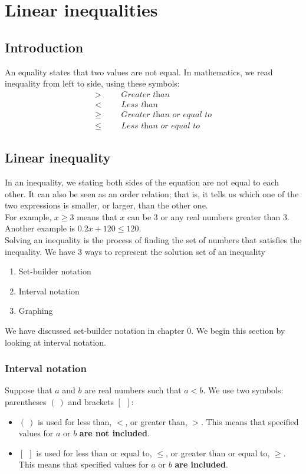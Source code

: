 \chapter{Linear inequalities}
\section{Introduction}
An equality states that two values are not equal. In mathematics, we read inequality from left to side, using these symbols:
\begin{align*}
            >&  &   &\textit{Greater than}\\
            <&  &   &\textit{Less than}\\
            \ge&    &   &\textit{Greater than or equal to}\\
            \le&    &   &\textit{Less than or equal to}
\end{align*}
\section{Linear inequality}
In an inequality, we stating both sides of the equation are not equal to each other. It can also be seen as an order relation; that is, it tells us which one of the two expressions is smaller, or larger, than the other one.\\
For example, $x\ge3$ means that $x$ can be 3 or any real numbers greater than $3$. Another example is $0.2x+120\le 120$.\\
Solving an inequality is the process of finding the set of numbers that satisfies the inequality. We have 3 ways to represent the solution set of an inequality
\begin{enumerate}
    \item Set-builder notation
    \item Interval notation
    \item Graphing
\end{enumerate}
We have discussed set-builder notation in chapter 0. We begin this section by looking at interval notation.
\subsection{Interval notation}

Suppose that $a$ and $b$ are real numbers such that $a<b$.
We use two symbols: parentheses $\bm{(\ )}$ and brackets $\bm{[\ \ ]}$:
\begin{itemize}
    \item $\bm{(\ )}$ is used for less than, $<$, or greater than, $>$. This means that specified values for $a$ or $b$ \textbf{are not included}.
    \item $\bm{[\ \ ]}$ is used for less than or equal to, $\le$, or greater than or equal to, $\ge$. This means that specified values for $a$ or $b$ \textbf{are included}.
\end{itemize}


